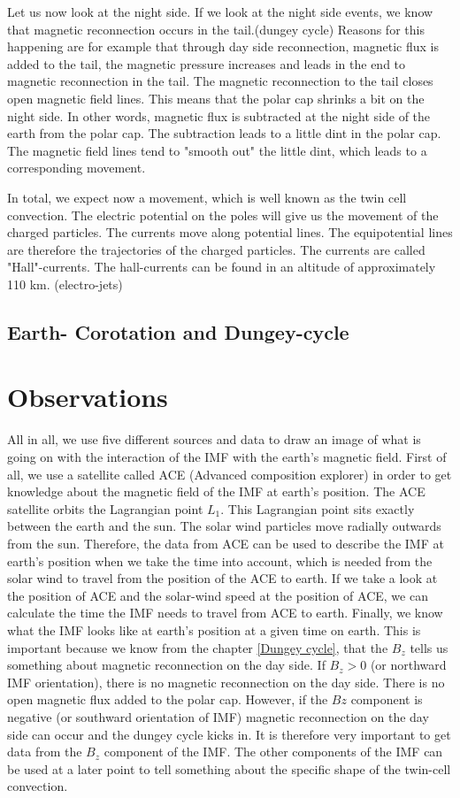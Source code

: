 \documentclass[10pt,a4paper]{article}
\begin{document}
Let us now look at the night side. If we look at the night side events, we know that magnetic reconnection occurs in the tail.(dungey cycle) Reasons for this happening are for example that through day side reconnection, magnetic flux is added to the tail, the magnetic pressure increases and leads in the end to magnetic reconnection in the tail. 
The magnetic reconnection to the tail closes open magnetic field lines. This means that the polar cap shrinks a bit on the night side. In other words, magnetic flux is subtracted at the night side of the earth from the polar cap. The subtraction leads to a little dint in the polar cap. The magnetic field lines tend to "smooth out" the little dint, which leads to a corresponding movement. 

In total, we expect now a movement, which is well known as the twin cell convection. The electric potential on the poles will give us the movement of the charged particles. The currents move along potential lines. The equipotential lines are therefore the trajectories of the charged particles. The currents are called "Hall"-currents. The hall-currents can be found in an altitude of approximately 110 km. (electro-jets)
\subsection{Earth- Corotation and Dungey-cycle}


\section{Observations}

All in all, we use five different sources and data to draw an image of what is going on with the interaction of the IMF with the earth's magnetic field. 
First of all, we use a satellite called ACE (Advanced composition explorer) in order to get knowledge about the magnetic field of the IMF at earth's position. The ACE satellite orbits the Lagrangian point $L_1$. This Lagrangian point sits exactly between the earth and the sun. The solar wind particles move radially outwards from the sun. Therefore, the data from ACE can be used to describe the IMF at earth's position when we take the time into account, which is needed from the solar wind to travel from the position of the ACE to earth. 
If we take a look at the position of ACE and the solar-wind speed at the position of ACE, we can calculate the time the IMF needs to travel from ACE to earth. 
Finally, we know what the IMF looks like at earth's position at a given time on earth. 
This is important because we know from the chapter \ref{Dungey cycle}, that the $B_z$ tells us something about magnetic reconnection on the day side. If $B_z>0$ (or northward IMF orientation), there is no magnetic reconnection on the day side. There is no open magnetic flux added to the polar cap. 
However, if the $Bz$ component is negative (or southward orientation of IMF) magnetic reconnection on the day side can occur and the dungey cycle kicks in. 
It is therefore very important to get data from the $B_z$ component of the IMF. The other components of the IMF can be used at a later point to tell something about the specific shape of the twin-cell convection. 
\end{document}
